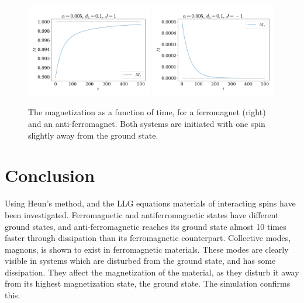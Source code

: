 \documentclass{article}
\begin{document}
    \begin{figure}[H]
        \centering
        \includegraphics[width=0.49\textwidth]{../plots/mag.pdf}
        \includegraphics[width=0.49\textwidth]{../plots/mag2.pdf}
        \caption{The magnetization as a function of time, for a ferromagnet (right) and an anti-ferromagnet. Both systems are initiated with one spin slightly away from the ground state.}
        \label{mag}
    \end{figure}

    \section*{Conclusion}
    Using Heun's method, and the LLG equations materials of interacting spins have been investigated.
    Ferromagnetic and antiferromagnetic states have different ground states, and anti-ferromagnetic reaches its ground state almost 10 times faster through dissipation than its ferromagnetic counterpart.
    Collective modes, magnons, is shown to exist in ferromagnetic materials.
    These modes are clearly visible in systems which are disturbed from the ground state, and has some dissipation.
    They affect the magnetization of the material, as they disturb it away from its highest magnetization state, the ground state.
    The simulation confirms this.


    \printbibliography
\end{document}

